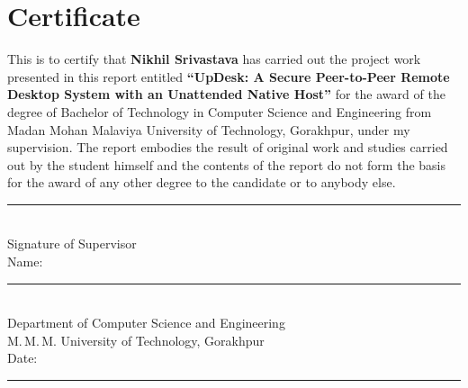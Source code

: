 \chapter*{Certificate}
\thispagestyle{plain}

This is to certify that \textbf{Nikhil Srivastava} has carried out the project
work presented in this report entitled \textbf{``UpDesk: A Secure Peer-to-Peer
Remote Desktop System with an Unattended Native Host''} for the award of the
degree of Bachelor of Technology in Computer Science and Engineering from Madan
Mohan Malaviya University of Technology, Gorakhpur, under my supervision. The
report embodies the result of original work and studies carried out by the
student himself and the contents of the report do not form the basis for the
award of any other degree to the candidate or to anybody else.

\vspace{3cm}
\begin{flushright}
\noindent\rule{7cm}{0.4pt}\\
Signature of Supervisor\\
Name: \rule{4.5cm}{0.4pt}\\
Department of Computer Science and Engineering\\
M.\,M.\,M. University of Technology, Gorakhpur\\[10pt]
Date: \rule{4cm}{0.4pt}
\end{flushright}

\clearpage
